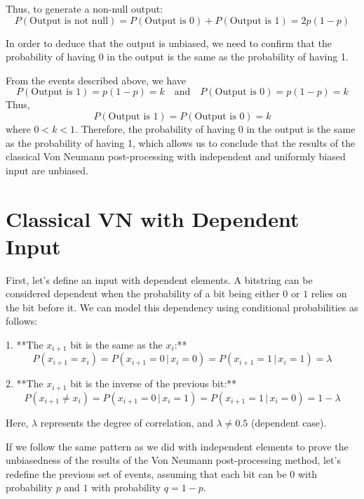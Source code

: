 Thus, to generate a non-null output:
\begin{equation}
P(\text{Output is not null}) = P(\text{Output is 0}) + P(\text{Output is 1}) = 2p(1 - p)
\end{equation}

In order to deduce that the output is unbiased, we need to confirm that the probability of having 0 in the output is the same as the probability of having 1.

From the events described above, we have 
\begin{equation}
P(\text{Output is 1}) = p(1-p) = k \quad \text{and} \quad P(\text{Output is 0}) = p(1-p) = k
\end{equation}
Thus,
\begin{equation}
P(\text{Output is 1}) = P(\text{Output is 0}) = k
\end{equation}
where \( 0 < k < 1 \). Therefore, the probability of having 0 in the output is the same as the probability of having 1, which allows us to conclude that the results of the classical Von Neumann post-processing with independent and uniformly biased input are unbiased.

\section{Classical VN with Dependent Input}

First, let's define an input with dependent elements. A bitstring can be considered dependent when the probability of a bit being either \( 0 \) or \( 1 \) relies on the bit before it. We can model this dependency using conditional probabilities as follows:  

1. **The \( x_{i+1} \) bit is the same as the \( x_i \):**  
   \begin{equation}
   P(x_{i+1} = x_i) = P(x_{i+1} = 0 \,|\, x_i = 0) = P(x_{i+1} = 1 \,|\, x_i = 1) = \lambda
   \end{equation}  

2. **The \( x_{i+1} \) bit is the inverse of the previous bit:**  
   \begin{equation}
   P(x_{i+1} \neq x_i) = P(x_{i+1} = 0 \,|\, x_i = 1) = P(x_{i+1} = 1 \,|\, x_i = 0) = 1 - \lambda
   \end{equation}  

Here, \( \lambda \) represents the degree of correlation, and \( \lambda \neq 0.5 \) (dependent case).  

If we follow the same pattern as we did with independent elements to prove the unbiasedness of the results of the Von Neumann post-processing method, let’s redefine the previous set of events, assuming that each bit can be \( 0 \) with probability \( p \) and \( 1 \) with probability \( q = 1 - p \). \\ 


